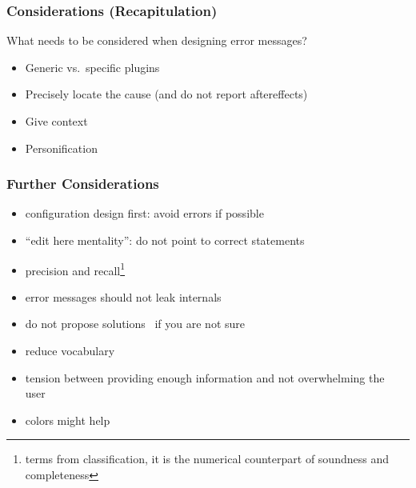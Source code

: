 \begin{frame}
	\frametitle{Considerations (Recapitulation)}

	\begin{task}
	What needs to be considered when designing error messages?
	\end{task}

	\begin{itemize} %
	\item Generic vs.\ specific plugins
	\item Precisely locate the cause (and do not report aftereffects)
	\item Give context
	\item Personification~\cite{lee2011personifying}
	\end{itemize}
\end{frame}

\begin{frame}
	\frametitle{Further Considerations}

	\begin{itemize}[<+-| alert@+>]
	\item configuration design first: avoid errors if possible
	\item ``edit here mentality'': do not point to correct statements~\cite{marceau2011mind}
	\item precision and recall\footnote{terms from classification, it is the numerical counterpart of soundness and completeness}~\cite{wrenn2017error}
	\item error messages should not leak internals~\cite{brown1983error}
	\item do not propose solutions~\cite{marceau2011mind} if you are not sure
	\item reduce vocabulary~\cite{marceau2011mind}
	\item tension between providing enough information and not overwhelming the user~\cite{wrenn2017error}
	\item colors might help~\cite{wrenn2017error}
	\end{itemize}
\end{frame}

